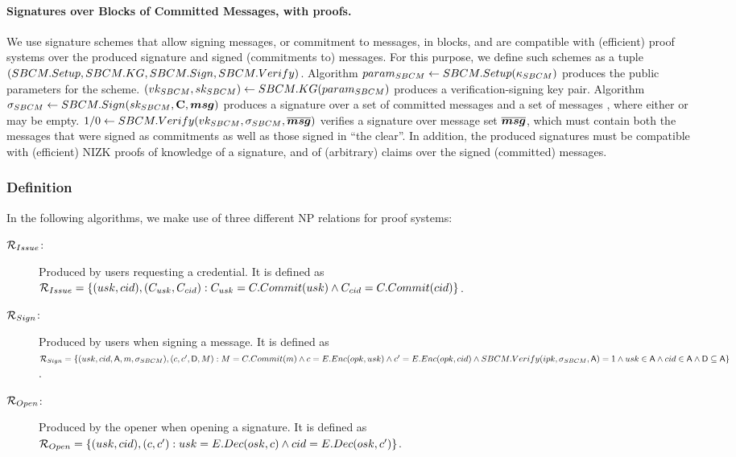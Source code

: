 \paragraph{Signatures over Blocks of Committed Messages, with proofs.} %
We use signature schemes that allow signing messages, or commitment to messages,
in blocks, and are compatible with (efficient) proof systems over the produced
signature and signed (commitments to) messages. For this purpose, we define such
schemes as a tuple $(SBCM.Setup,SBCM.KG,SBCM.Sign,SBCM.Verify)$. Algorithm
$param_{SBCM} \gets SBCM.Setup(\kappa_{SBCM})$ produces the public parameters for the
scheme. $(vk_{SBCM},sk_{SBCM}) \gets SBCM.KG(param_{SBCM})$ produces a
verification-signing key
pair. Algorithm $\sigma_{SBCM} \gets SBCM.Sign(sk_{SBCM},\mathbf{C},\boldsymbol{msg})$ produces a
signature over a set of committed messages \Ccomset and a set of messages
\msgset, where either \Ccomset or \msgset may be empty. $1/0 \gets
SBCM.Verify(vk_{SBCM},\sigma_{SBCM},\overline{\boldsymbol{msg}})$ verifies a signature \SBCMsig
over message set $\overline{\boldsymbol{msg}}$, which must contain both the messages that
were signed as commitments as well as those signed in ``the clear''. In
addition, the produced signatures must be compatible with (efficient) NIZK
proofs of knowledge of a signature, and of (arbitrary) claims over the signed
(committed) messages.

\subsubsection{Definition}
\label{sssec:generic-gsac-definition}

In the following algorithms, we make use of three different NP relations for
\NIZK proof systems:

\begin{description}
\item[$\mathcal{R}_{Issue}$:] Produced by users requesting a credential. It is
  defined as $\mathcal{R}_{Issue} = \lbrace (usk,cid), (C_{usk},C_{cid}) :
  C_{usk} = C.Commit(usk) \land C_{cid} = C.Commit(cid) \rbrace$.
\item[$\mathcal{R}_{Sign}$:] Produced by users when signing a message. It is
  defined as $\mathcal{R}_{Sign} = \lbrace (usk,cid,\mathsf{A},m,\sigma_{SBCM}),
  (c,c',\mathsf{D},M) : M = C.Commit(m) \land c = E.Enc(opk,usk) \land
  c' = E.Enc(opk,cid) \land SBCM.Verify(ipk,\sigma_{SBCM},\mathsf{A}) = 1 \land
  usk \in \mathsf{A} \land cid \in \mathsf{A} \land \mathsf{D} \subseteq \mathsf{A} \rbrace$.
\item[$\mathcal{R}_{Open}$:] Produced by the opener when opening a signature. It
  is defined as $\mathcal{R}_{Open} = \lbrace (usk,cid), (c,c') :
  usk = E.Dec(osk,c) \land cid = E.Dec(osk,c') \rbrace$.
\end{description}

